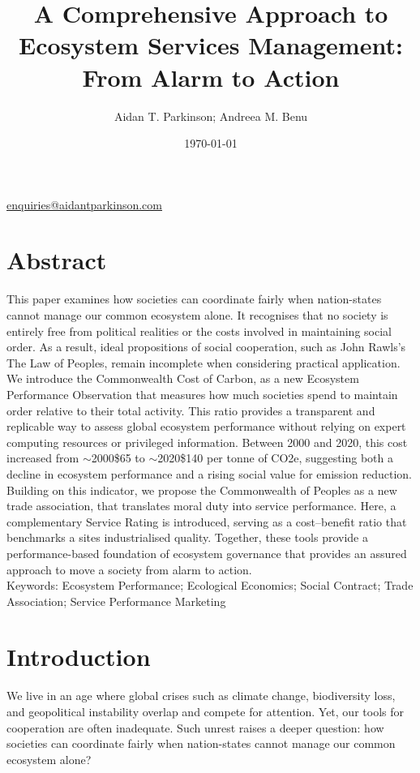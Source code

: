 \documentclass[12pt, oneside]{article}   	%
\title{A Comprehensive Approach to Ecosystem Services Management: From Alarm to Action}
\author{Aidan T. Parkinson; Andreea M. Benu}
\date{\today}							%
\begin{document}
\maketitle
\begin{center}
\href{mailto:enquiries@aidantparkinson.com}{enquiries@aidantparkinson.com}
\end{center}

\section{Abstract}
This paper examines how societies can coordinate fairly when nation-states cannot manage our common ecosystem alone.
It recognises that no society is entirely free from political realities or the costs involved in maintaining social order.
As a result, ideal propositions of social cooperation, such as John Rawls’s The Law of Peoples, remain incomplete when considering practical application.
We introduce the Commonwealth Cost of Carbon, as a new Ecosystem Performance Observation that measures how much societies spend to maintain order relative to their total activity.
This ratio provides a transparent and replicable way to assess global ecosystem performance without relying on expert computing resources or privileged information.
Between 2000 and 2020, this cost increased from $\sim$2000\$65 to $\sim$2020\$140 per tonne of CO2e, suggesting both a decline in ecosystem performance and a rising social value for emission reduction.
Building on this indicator, we propose the Commonwealth of Peoples as a new trade association, that translates moral duty into service performance.
Here, a complementary Service Rating is introduced, serving as a cost–benefit ratio that benchmarks a sites industrialised quality.
Together, these tools provide a performance-based foundation of ecosystem governance that provides an assured approach to move a society from alarm to action.\\

Keywords: Ecosystem Performance; Ecological Economics; Social Contract; Trade Association; Service Performance Marketing\\

\section{Introduction}

We live in an age where global crises such as climate change, biodiversity loss, and geopolitical instability overlap and compete for attention.
Yet, our tools for cooperation are often inadequate.
Such unrest raises a deeper question: how societies can coordinate fairly when nation-states cannot manage our common ecosystem alone?\\
\end{document}
